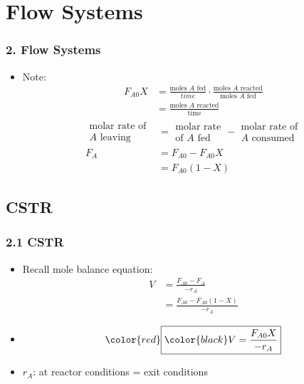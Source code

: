 \section{Flow Systems}
\begin{frame}\frametitle{2. \color{blue}Flow Systems}
	\begin{itemize}
		\item	Note:
		\begin{align*}
			F_{A0}X &= \frac{\text{moles }A\text{ fed}}{time}\cdot\frac{\text{moles }A\text{ reacted}}{\text{moles }A\text{ fed}}\\
			&= \frac{\text{moles }A\text{ reacted}}{\text{time}}
		\end{align*}
		\begin{align*}
			\begin{array}{c}
				\text{molar rate of}\\A\text{ leaving}
			\end{array}
			&=
			\begin{array}{c}
				\text{molar rate}\\\text{of }A\text{ fed}
			\end{array}
			-
			\begin{array}{c}
				\text{molar rate of}\\A\text{ consumed}
			\end{array}
			\\
			F_A &= F_{A0} - F_{A0}X\\
			&= F_{A0}(1 - X)
		\end{align*}
	\end{itemize}
\end{frame}

\subsection{CSTR}
\begin{frame}\frametitle{2.1 \color{blue}CSTR}
	\begin{itemize}
		\item	Recall mole balance equation:
		\begin{align*}
			V &= \frac{F_{A0} - F_A}{-r_A}\\
			&= \frac{F_{A0} - F_{A0}(1 - X)}{-r_A}
		\end{align*}
		\item	$$\color{red}\boxed{\color{black}V = \frac{F_{A0}X}{-r_A}}$$
		\item	$r_A$: \color{orange}at reactor conditions = exit conditions
	\end{itemize}
\end{frame}

